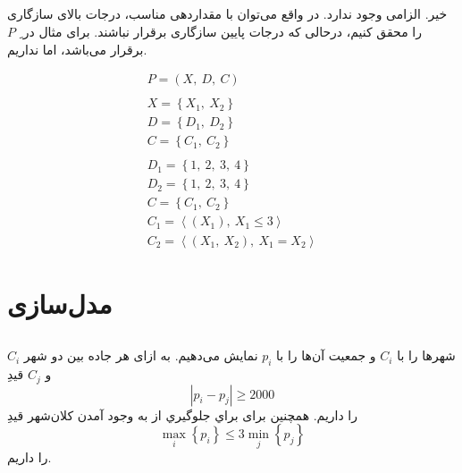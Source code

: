 \documentclass{article}
\begin{document}
\subsection{}
خیر. الزامی وجود ندارد. در واقع می‌توان با مقداردهی مناسب، درجات بالای سازگاری را محقق کنیم، درحالی که درجات پایین سازگاری برقرار نباشند. برای مثال در ِ $P$  برقرار می‌باشد، اما  نداریم. \\
\begin{fleqn}
\begin{equation}
\begin{aligned}
P = (X,\:D,\:C) \\ \\
X = \left\{ X_{1},\:X_{2} \right\} \\
D = \left\{ D_{1},\:D_{2} \right\} \\
C = \left\{ C_{1},\:C_{2} \right\} \\ \\
D_{1} = \left\{ 1,\:2,\:3,\:4 \right\} \\
D_{2} = \left\{ 1,\:2,\:3,\:4 \right\} \\
C = \left\{ C_{1},\:C_{2} \right\}\\
C_{1} = \left\langle \left( X_{1} \right),\: X_{1} \le 3 \right\rangle\\
C_{2} = \left\langle \left( X_{1},\: X_{2} \right),\: X_{1} = X_{2} \right\rangle
\end{aligned}
\end{equation}
\end{fleqn}
\subsection{}

\section{مدل‌سازی}
\subsection{}
شهرها را با $C_{i}$ و جمعیت آن‌ها را با $p_{i}$ نمایش می‌دهیم. به ازای هر جاده بین دو شهر $C_{i}$ و $C_{j}$ قیدِ
\begin{equation}
\left| p_{i} - p_{j} \right| \ge 2000
\end{equation}
را داریم. همچنین برای براي جلوگيري از به وجود آمدن كلان‌شهر قیدِ
\begin{equation}
\max_{i}\left\{ p_{i} \right\} \le 3\min_{j}\left\{ p_{j} \right\}
\end{equation}
را داریم.
\end{document}

